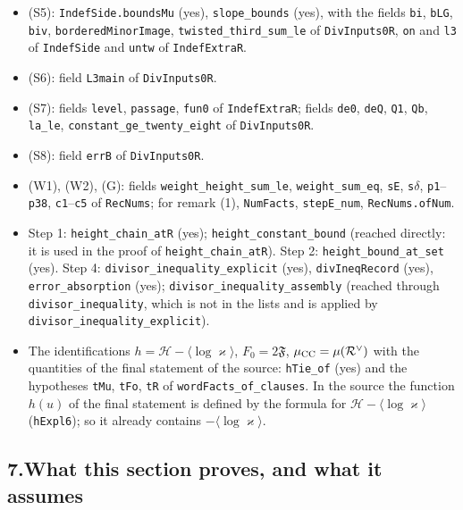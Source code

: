\documentclass[11pt,letterpaper]{article}
\begin{document}
\begin{itemize}[leftmargin=1.6em,itemsep=2pt,topsep=3pt]
{the name \texttt{KcDiff.principal}. It compares the last component of a name only, so this name cannot
match, and the empty answer says nothing).\par}
\item (S5): \texttt{IndefSide.boundsMu} (yes), \texttt{slope\_bounds} (yes), with the fields
\texttt{bi}, \texttt{bLG}, \texttt{biv}, \texttt{borderedMinorImage},
\texttt{twisted\_third\_sum\_le} of \texttt{DivInputs0R}, \texttt{on} and \texttt{l3} of
\texttt{IndefSide} and \texttt{untw} of \texttt{IndefExtraR}.
\item (S6): field \texttt{L3main} of \texttt{DivInputs0R}.
\item (S7): fields \texttt{level}, \texttt{passage}, \texttt{fun0} of \texttt{IndefExtraR}; fields
\texttt{de0}, \texttt{deQ}, \texttt{Q1}, \texttt{Qb}, \texttt{la\_le},
\texttt{constant\_ge\_twenty\_eight} of \texttt{DivInputs0R}.
\item (S8): field \texttt{errB} of \texttt{DivInputs0R}.
\item (W1), (W2), (G): fields \texttt{weight\_height\_sum\_le}, \texttt{weight\_sum\_eq}, \texttt{sE},
\texttt{s}$\delta$, \texttt{p1}--\texttt{p38}, \texttt{c1}--\texttt{c5} of \texttt{RecNums}; for remark
(1), \texttt{NumFacts}, \texttt{stepE\_num}, \texttt{RecNums.ofNum}.
\item {\sloppy Step 1: \texttt{height\_chain\_atR} (yes); \texttt{height\_constant\_bound} (reached directly: it
is used in the proof of \texttt{height\_chain\_atR}). Step 2:
\texttt{height\_bound\_at\_set} (yes). Step 4: \texttt{divisor\_inequality\_explicit} (yes),
\texttt{divIneqRecord} (yes), \texttt{error\_absorption} (yes); \texttt{divisor\_inequality\_assembly}
(reached through \texttt{divisor\_inequality}, which is not in the lists and is applied by
\texttt{divisor\_inequality\_explicit}).\par}
\item The identifications $h=\mathcal H-\langle\log\varkappa\rangle$, $F_0=2\mathfrak F$,
$\mu_{\rm CC}=\mu(\mathcal R^\vee)$ with the quantities of the final statement of the source:
\texttt{hTie\_of} (yes) and the hypotheses \texttt{tMu}, \texttt{tFo}, \texttt{tR} of
\texttt{wordFacts\_of\_clauses}. In the source the function $h(u)$ of the final statement is defined by
the formula for $\mathcal H-\langle\log\varkappa\rangle$ (\texttt{hExpl6}); so it already contains
$-\langle\log\varkappa\rangle$.
\end{itemize}

\subsection*{7.\quad What this section proves, and what it assumes}
\end{document}
